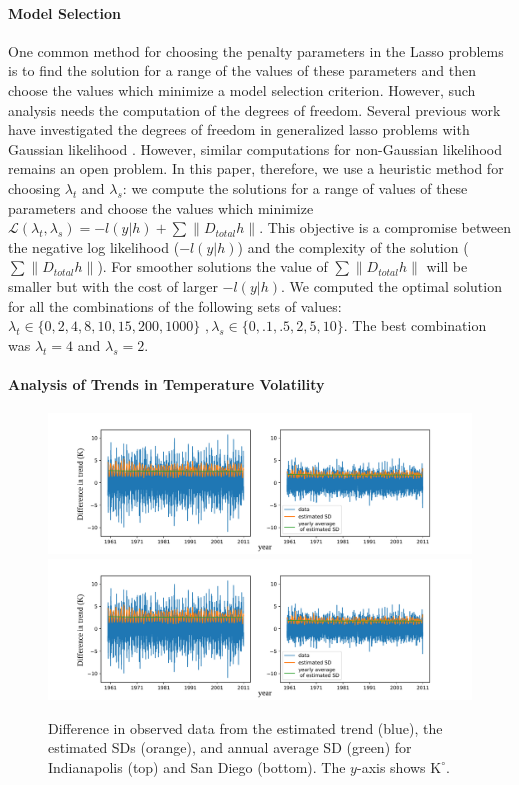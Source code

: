 \documentclass[letterpaper]{article} %
\begin{document}
\paragraph{Model Selection}
One common method for choosing the penalty parameters in the Lasso
problems is to find the solution for a range of the values of these
parameters and then choose the values which minimize a model selection
criterion. However, such analysis needs the computation of the degrees
of freedom. Several previous work have investigated the degrees of freedom in
generalized lasso problems with Gaussian likelihood
\cite{tibshirani_degrees_2012,hu_dual_2015,zeng_geometry_2017}. However,
similar computations for non-Gaussian likelihood remains an open problem.
In this paper, therefore, we use a heuristic method for choosing $\lambda_t$ and
$\lambda_s$: we compute the solutions for a range of values of
these parameters and choose the values which minimize
$\mathscr{L}(\lambda_t,\lambda_s)=-l(y|h)+ \sum \lVert D_{total}h
\lVert$. This objective is a compromise between the negative log
likelihood ($-l(y|h)$) and the complexity of the solution ($\sum
\lVert D_{total}h \lVert$). For smoother solutions the value of $\sum
\lVert D_{total}h \lVert$ will be smaller but with the cost of larger
$-l(y|h)$. We computed the optimal solution for all the combinations of the
following sets of values: $\lambda_t \in \{0,2,4,8,10,15,200,1000\} \, \, ,
\lambda_s \in \{0,.1,.5,2,5,10\}$. The best combination was
$\lambda_t=4$ and $\lambda_s=2$. 


\paragraph{Analysis of Trends in Temperature Volatility}

\begin{figure}[tb]
  \centering
  \includegraphics[width=.66\columnwidth]{Figures/ts_estimatedVarLeft}
  \includegraphics[width=.66\columnwidth]{Figures/ts_estimatedVarRight}
  \caption{Difference in observed data from the estimated trend
    (blue), the estimated SDs (orange), and annual average SD (green) for
   Indianapolis (top) and San Diego (bottom). The $y$-axis shows $\textrm{K}^{\circ}$.} 
  \label{fig:avg_change_estimatedSD}
\end{figure} 
\end{document}
